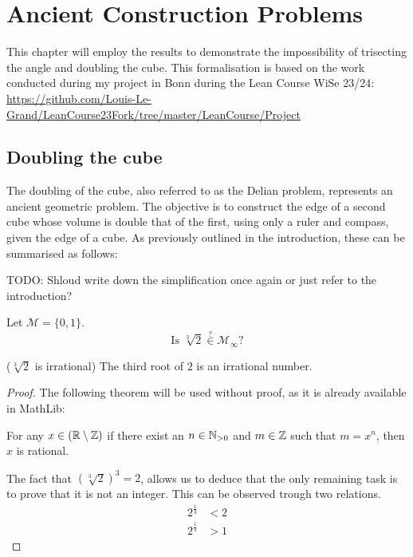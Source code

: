 \chapter{Ancient Construction Problems}
This chapter will employ the results to demonstrate the impossibility of trisecting the angle and doubling the cube. 
This formalisation is based on the work conducted during my project in Bonn during the Lean Course WiSe 23/24: 
\url{https://github.com/Louis-Le-Grand/LeanCourse23Fork/tree/master/LeanCourse/Project}

\section{Doubling the cube}
The doubling of the cube, also referred to as the Delian problem, represents an ancient geometric problem.
The objective is to construct the edge of a second cube whose volume is double that of the first, using only a ruler and compass, given the edge of a cube.
As previously outlined in the introduction, these can be summarised as follows: 

TODO: Shloud write down the simplification once again or just refer to the introduction?
\begin{problem}
    Let $\mathcal{M} = \{0,1\}$.  
    $$\text{Is }\sqrt[3]{2} \overset{?}{\in} \mathcal{M}_{\infty}?$$
\end{problem}

\begin{lemma}($\sqrt[3]{2}$ is irrational)
    \label{lem:irrational_thirdroot_two}
    \leanok
    The third root of $2$ is an irrational number.
\end{lemma}
\begin{proof}
    The following theorem will be used without proof, as it is already available in MathLib:
    \begin{theorem*}
        For any $x\in(\mathbb{R}\setminus\mathbb{Z})$ if there exist an $n\in \mathbb{N}_{>0}$ and $m\in\mathbb{Z}$ such that $m = x^n$, then $x$ is rational. 
    \end{theorem*}
    The fact that $(\sqrt[3]{2})^3=2$, allows us to deduce that the only remaining task is to prove that it  is not an integer. 
    This can be observed trough two relations.
    \begin{align}
        2^{\frac{1}{3}} &< 2 \\
        2^{\frac{1}{3}} &> 1
    \end{align}
\end{proof}

